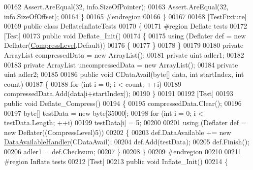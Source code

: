 \begin{DoxyCode}
00162             Assert.AreEqual(32, info.SizeOfPointer);
00163             Assert.AreEqual(32, info.SizeOfOffset);
00164         \}
00165 \textcolor{preprocessor}{        #endregion}
00166     \}
00167 
00168     [TestFixture]
00169     \textcolor{keyword}{public} \textcolor{keyword}{class }DeflateInflateTests
00170     \{
00171 \textcolor{preprocessor}{        #region Deflate tests}
00172         [Test]
00173         \textcolor{keyword}{public} \textcolor{keywordtype}{void} Deflate\_Init()
00174         \{
00175             \textcolor{keyword}{using} (Deflater def = \textcolor{keyword}{new} Deflater(\hyperlink{namespace_dot_z_lib_a034f7a1ef9856d8834e6f6b1c53d8a4c}{CompressLevel}.Default))
00176             \{
00177             \}
00178         \}
00179 
00180         \textcolor{keyword}{private} ArrayList compressedData = \textcolor{keyword}{new} ArrayList();
00181         \textcolor{keyword}{private} uint adler1;
00182 
00183         \textcolor{keyword}{private} ArrayList uncompressedData = \textcolor{keyword}{new} ArrayList();
00184         \textcolor{keyword}{private} uint adler2;
00185 
00186         \textcolor{keyword}{public} \textcolor{keywordtype}{void} CDataAvail(byte[] data, \textcolor{keywordtype}{int} startIndex, \textcolor{keywordtype}{int} count)
00187         \{
00188             \textcolor{keywordflow}{for} (\textcolor{keywordtype}{int} i = 0; i < count; ++i)
00189                 compressedData.Add(data[i+startIndex]);
00190         \}
00191 
00192         [Test]
00193         \textcolor{keyword}{public} \textcolor{keywordtype}{void} Deflate\_Compress()
00194         \{
00195             compressedData.Clear();
00196 
00197             byte[] testData = \textcolor{keyword}{new} byte[35000];
00198             \textcolor{keywordflow}{for} (\textcolor{keywordtype}{int} i = 0; i < testData.Length; ++i)
00199                 testData[i] = 5;
00200 
00201             \textcolor{keyword}{using} (Deflater def = \textcolor{keyword}{new} Deflater((CompressLevel)5))
00202             \{
00203                 def.DataAvailable += \textcolor{keyword}{new} \hyperlink{namespace_dot_z_lib_a13a751b897fc2af0be2307e4deb7eb1c}{DataAvailableHandler}(CDataAvail);
00204                 def.Add(testData);
00205                 def.Finish();
00206                 adler1 = def.Checksum;
00207             \}
00208         \}
00209 \textcolor{preprocessor}{        #endregion}
00210 
00211 \textcolor{preprocessor}{        #region Inflate tests}
00212         [Test]
00213         \textcolor{keyword}{public} \textcolor{keywordtype}{void} Inflate\_Init()
00214         \{

\end{DoxyCode}
